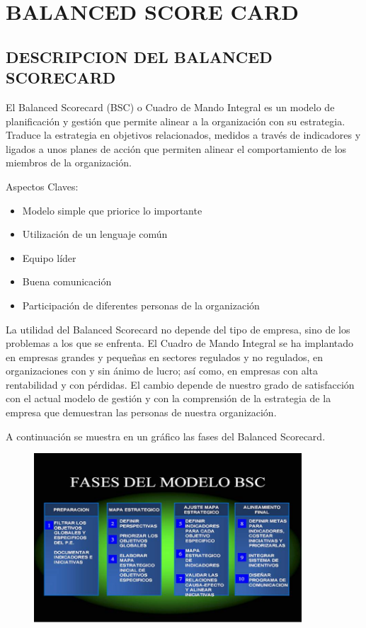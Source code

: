 \section{BALANCED SCORE CARD} 

\subsection{ DESCRIPCION DEL BALANCED SCORECARD}

	El Balanced Scorecard (BSC) o Cuadro de Mando Integral es un modelo de planificación y gestión que permite alinear a la 			organización con su estrategia. Traduce la estrategia en objetivos relacionados, medidos a través de indicadores y ligados a unos 		planes de acción que permiten alinear el comportamiento de los miembros de la organización.

	Aspectos Claves:
	
	\begin{itemize}
	
		\item  Modelo simple que priorice lo importante
		\item  Utilización de un lenguaje común
		\item  Equipo líder
		\item  Buena comunicación
		\item  Participación de diferentes personas de la organización

	\end{itemize}

	La utilidad del Balanced Scorecard no depende del tipo de empresa, sino de los problemas a los que se enfrenta. El Cuadro de 			Mando Integral se ha implantado en empresas grandes y pequeñas en sectores regulados y no regulados, en organizaciones con 		y sin ánimo de lucro; así como, en empresas con alta rentabilidad y con pérdidas. El cambio depende de nuestro grado de 			satisfacción con el actual modelo de gestión y con la comprensión de la estrategia de la empresa que demuestran las personas de 		nuestra organización.

	A continuación se muestra en un gráfico las fases del Balanced Scorecard.

			\begin{figure}[htb]
				\begin{center}
					\includegraphics[width=10cm]{./Imagenes/1}
				\end{center}
			\end{figure}

